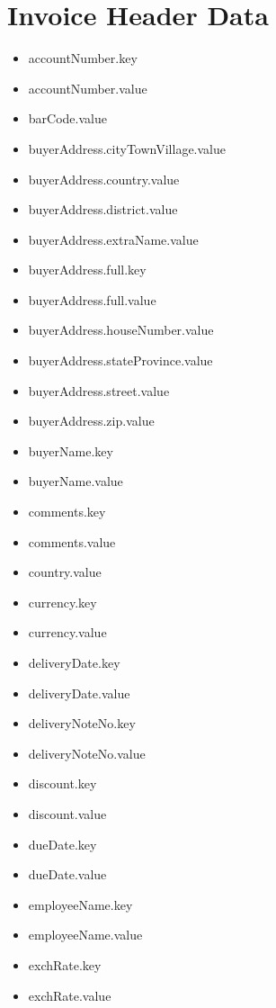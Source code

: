 \cleardoublepage


\section{Invoice Header Data}
\begin{multicols}{2}
	\label{invoice-header}
	\begin{itemize}
		\setlength\multicolsep{0pt}
		\item[] accountNumber.key
		\item[] accountNumber.value
		\item[] barCode.value
		\item[] buyerAddress.cityTownVillage.value
		\item[] buyerAddress.country.value
		\item[] buyerAddress.district.value
		\item[] buyerAddress.extraName.value
		\item[] buyerAddress.full.key
		\item[] buyerAddress.full.value
		\item[] buyerAddress.houseNumber.value
		\item[] buyerAddress.stateProvince.value
		\item[] buyerAddress.street.value
		\item[] buyerAddress.zip.value
		\item[] buyerName.key
		\item[] buyerName.value
		\item[] comments.key
		\item[] comments.value
		\item[] country.value
		\item[] currency.key
		\item[] currency.value
		\item[] deliveryDate.key
		\item[] deliveryDate.value
		\item[] deliveryNoteNo.key
		\item[] deliveryNoteNo.value
		\item[] discount.key
		\item[] discount.value
		\item[] dueDate.key
		\item[] dueDate.value
		\item[] employeeName.key
		\item[] employeeName.value
		\item[] exchRate.key
		\item[] exchRate.value

\end{itemize}
\end{multicols}

